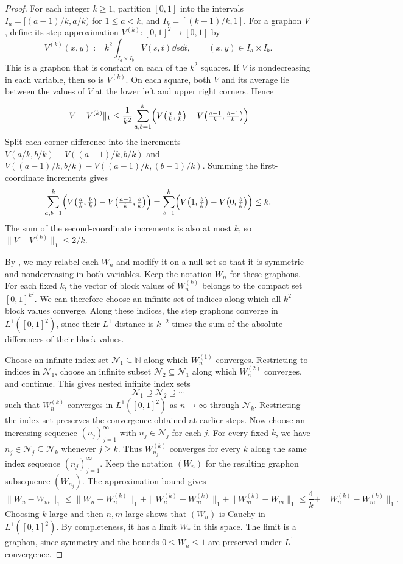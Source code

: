 \begin{proof}
For each integer $k\ge1$, partition $[0,1]$ into the intervals
$I_a=[(a-1)/k,a/k)$ for $1\le a<k$, and $I_k=[(k-1)/k,1]$.
For a graphon $V$, define its step approximation
$V^{(k)}:[0,1]^2\to[0,1]$ by
\[
  V^{(k)}(x,y):=k^2\int_{I_a\times I_b}V(s,t)\dd s\dd t,
  \qquad (x,y)\in I_a\times I_b.
\]
This is a graphon that is constant on each of the $k^2$ squares.
If $V$ is nondecreasing in each variable, then so is $V^{(k)}$.
On each square, both $V$ and its average lie between the values of $V$
at the lower left and upper right corners. Hence
\[
  \|V-V^{(k)}\|_1
  \le\frac1{k^2}\sum_{a,b=1}^k\Bigl(V\bigl(\tfrac ak,\tfrac bk\bigr)
  -V\bigl(\tfrac{a-1}k,\tfrac{b-1}k\bigr)\Bigr).
\]
Split each corner difference into the increments $V(a/k,b/k)-V((a-1)/k,b/k)$
and $V((a-1)/k,b/k)-V((a-1)/k,(b-1)/k)$. Summing the first-coordinate
increments gives
\[
  \sum_{a,b=1}^k\Bigl(V\bigl(\tfrac ak,\tfrac bk\bigr)
    -V\bigl(\tfrac{a-1}k,\tfrac bk\bigr)\Bigr)
  =\sum_{b=1}^k\Bigl(V\bigl(1,\tfrac bk\bigr)-V\bigl(0,\tfrac bk\bigr)\Bigr)
  \le k.
\]
The sum of the second-coordinate increments is also at most $k$, so
$\|V-V^{(k)}\|_1\le2/k$.

By , we may relabel each $W_n$ and modify it
on a null set so that it is symmetric and nondecreasing in both variables.
Keep the notation $W_n$ for these graphons.
For each fixed $k$, the vector of block values of $W_n^{(k)}$ belongs to
the compact set $[0,1]^{k^2}$. We can therefore choose an infinite set
of indices along which all $k^2$ block values converge. Along these
indices, the step graphons converge in $L^1([0,1]^2)$, since their
$L^1$ distance is $k^{-2}$ times the sum
of the absolute differences of their block values.

Choose an infinite index set $\mathcal N_1\subseteq\mathbb N$ along which
$W_n^{(1)}$ converges. Restricting to indices in $\mathcal N_1$, choose an
infinite subset $\mathcal N_2\subseteq\mathcal N_1$ along which $W_n^{(2)}$
converges, and continue. This gives nested infinite index sets
\[
  \mathcal N_1\supseteq\mathcal N_2\supseteq\cdots
\]
such that $W_n^{(k)}$ converges in $L^1([0,1]^2)$ as $n\to\infty$ through
$\mathcal N_k$. Restricting the index set preserves the convergence
obtained at earlier steps. Now choose an increasing sequence $(n_j)_{j=1}^\infty$
with $n_j\in\mathcal N_j$ for each $j$.
For every fixed $k$, we have $n_j\in\mathcal N_j\subseteq\mathcal N_k$
whenever $j\ge k$. Thus $W_{n_j}^{(k)}$ converges for every $k$ along
the same index sequence $(n_j)_{j=1}^\infty$. Keep the notation $(W_n)$ for the
resulting graphon subsequence $(W_{n_j})$. The approximation bound gives
\[
  \|W_n-W_m\|_1
  \le\|W_n-W_n^{(k)}\|_1+\|W_n^{(k)}-W_m^{(k)}\|_1
    +\|W_m^{(k)}-W_m\|_1
  \le\frac4k+\|W_n^{(k)}-W_m^{(k)}\|_1.
\]
Choosing $k$ large and then $n,m$ large shows that $(W_n)$ is Cauchy
in $L^1([0,1]^2)$. By completeness, it has a limit $W_*$ in this space.
The limit is a graphon, since symmetry and the bounds $0\le W_n\le1$
are preserved under $L^1$ convergence.


\end{proof}
